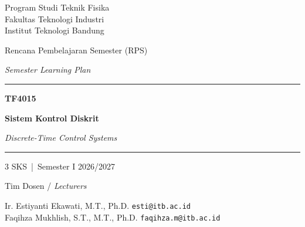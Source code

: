 \documentclass[11pt,a4paper]{article}
\newcommand{\en}[1]{{\color{black!60}\textit{#1}}}
\begin{document}
\begin{titlepage}
	\centering
	\vspace*{1.5cm}
	{\large Program Studi Teknik Fisika\\Fakultas Teknologi Industri\\Institut Teknologi Bandung\par}
	\vspace{2.5cm}
	{\Large Rencana Pembelajaran Semester (RPS)\par}
	{\large\en{Semester Learning Plan}\par}
	\vspace{1.2cm}
	{\color{skdblue}\rule{0.8\textwidth}{1.2pt}\par}
	\vspace{0.4cm}
	{\huge\bfseries TF4015\par}
	\vspace{0.3cm}
	{\LARGE\bfseries Sistem Kontrol Diskrit\par}
	\vspace{0.2cm}
	{\Large\en{Discrete-Time Control Systems}\par}
	\vspace{0.4cm}
	{\color{skdblue}\rule{0.8\textwidth}{1.2pt}\par}
	\vspace{1.2cm}
	{\large 3 SKS \,|\, Semester I 2026/2027\par}
	\vfill
	{\large Tim Dosen / \en{Lecturers}\par}
	\vspace{0.3cm}
	Ir. Estiyanti Ekawati, M.T., Ph.D. \quad \texttt{esti@itb.ac.id}\\
	Faqihza Mukhlish, S.T., M.T., Ph.D. \quad \texttt{faqihza.m@itb.ac.id}\par
	\vspace{1cm}
\end{titlepage}

\tableofcontents
\newpage
\end{document}
